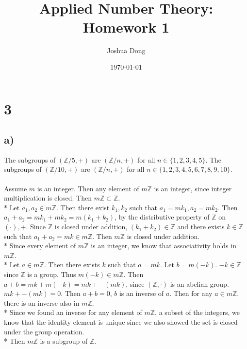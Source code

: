 \documentclass{article}
\begin{document}
\title{Applied Number Theory: Homework 1}
\author{Joshua Dong}
\date{\today}
\maketitle

\section{3}
\subsection{a)}
The subgroups of $(\mathbb{Z}/5, +)$ are
$(\mathbb{Z}/n, +)$ for all $n \in \{1, 2, 3, 4, 5\}$.
The subgroups of $(\mathbb{Z}/10, +)$ are
$(\mathbb{Z}/n, +)$ for all $n \in \{1, 2, 3, 4, 5, 6, 7, 8, 9, 10\}$.
\\\\
Assume $m$ is an integer. Then any element of $m\mathbb{Z}$ is an integer,
since integer multiplication is closed. Then $m\mathbb{Z} \subset \mathbb{Z}$.
\\*
Let $a_1, a_2 \in m\mathbb{Z}$.
Then there exist $k_1, k_2$ such that $a_1 = mk_1, a_2 = mk_2$.
Then $a_1 + a_2 = mk_1 + mk_2 = m(k_1 + k_2)$, by the distributive property
of $\mathbb{Z}$ on $(\cdot), +$. Since $\mathbb{Z}$ is closed under addition,
$(k_1 + k_2) \in \mathbb{Z}$ and there exists $k \in \mathbb{Z}$ such that
$a_1 + a_2 = mk \in m\mathbb{Z}$. Then $m\mathbb{Z}$ is closed under addition.
\\*
Since every element of $m\mathbb{Z}$ is an integer, we know that associativity holds in $m\mathbb{Z}$.
\\*
Let $a \in m\mathbb{Z}$. 
Then there exists $k$ such that $a = mk$.
Let $b = m(-k)$. $-k \in \mathbb{Z}$ since $\mathbb{Z}$ is a group.
Thus $m(-k) \in m\mathbb{Z}$.
Then $a + b = mk + m(-k) = mk + -(mk)$,
since $(\mathbb{Z}, \cdot)$ is an abelian group.
$mk + -(mk) = 0$.
Then $a + b = 0$, $b$ is an inverse of $a$.
Then for any $a \in m\mathbb{Z}$, there is an inverse also in $m\mathbb{Z}$.
\\*
Since we found an inverse for any element of $m\mathbb{Z}$,
a subset of the integers, we know that the identity element is unique since
we also showed the set is closed under the group operation.
\\*
Then $m\mathbb{Z}$ is a subgroup of $\mathbb{Z}$.
\end{document}
